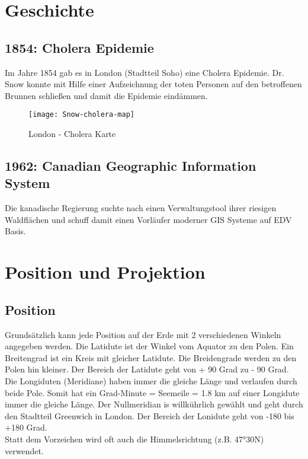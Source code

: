 \documentclass[11pt,fleqn]{book} %
\begin{document}
\chapter{Geschichte}

\section{1854: Cholera Epidemie}
Im Jahre 1854 gab es in London (Stadtteil Soho) eine Cholera Epidemie. Dr. Snow konnte mit Hilfe einer Aufzeichnung der toten Personen auf den betroffenen Brunnen schlie{\ss}en und damit die Epidemie eind\"ammen.

\begin{figure}[h]
\centering\texttt{[image: Snow-cholera-map]}
\caption{London - Cholera Karte}
\end{figure}

\section{1962: Canadian Geographic Information System}
Die kanadische Regierung suchte nach einen Verwaltungstool ihrer riesigen Waldfl\"achen und schuff damit einen Vorl\"aufer moderner GIS Systeme auf EDV Basis. 



\chapter{Position und Projektion}

\section{Position}
Grunds\"atzlich kann jede Position auf der Erde mit 2 verschiedenen Winkeln angegeben werden. Die Latidute ist der Winkel vom Aquator zu den Polen. 
Ein Breitengrad ist ein Kreis mit gleicher Latidute. Die Breidengrade werden zu den Polen hin kleiner. Der Bereich der Latidute geht von + 90 Grad zu - 90 Grad. \\
Die Longiduten (Meridiane) haben immer die gleiche L\"ange und verlaufen durch beide Pole. Somit hat ein Grad-Minute  = Seemeile = 1.8 km auf einer Longidute immer die gleiche L\"ange. Der Nullmeridian is willk\"uhrlich gew\"ahlt und geht durch den Stadtteil Greenwich in London. Der Bereich der Lonidute geht von -180 bis +180 Grad. \\
Statt dem Vorzeichen wird oft auch die Himmelsrichtung (z.B. 47°30{\textquotesingle}N) verwendet.   
 
\end{document}
